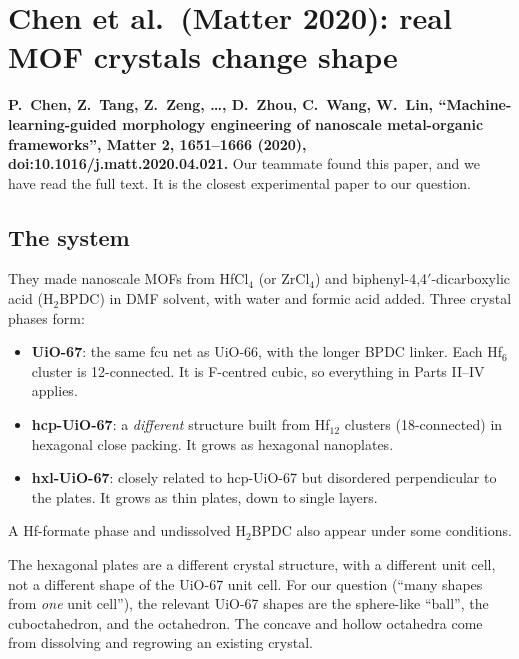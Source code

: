 \documentclass[11pt,a4paper]{article}
\theoremstyle{remark}\newtheorem*{example}{Worked example}
\begin{document}
\section{Chen et al.\ (Matter 2020): real MOF crystals change shape}\label{sec:chen}

\textbf{P.~Chen, Z.~Tang, Z.~Zeng, \dots, D.~Zhou, C.~Wang, W.~Lin, ``Machine-learning-guided morphology engineering of nanoscale metal-organic frameworks'', Matter 2, 1651--1666 (2020), doi:10.1016/j.matt.2020.04.021.} Our teammate found this paper, and we have read the full text. It is the closest experimental paper to our question.

\subsection{The system}
They made nanoscale MOFs from HfCl$_4$ (or ZrCl$_4$) and biphenyl-4,4$'$-dicarboxylic acid (H$_2$BPDC) in DMF solvent, with water and formic acid added. Three crystal phases form:
\begin{itemize}
\item \textbf{UiO-67}: the same fcu net as UiO-66, with the longer BPDC linker. Each Hf$_6$ cluster is 12-connected. It is F-centred cubic, so everything in Parts II--IV applies.
\item \textbf{hcp-UiO-67}: a \emph{different} structure built from Hf$_{12}$ clusters (18-connected) in hexagonal close packing. It grows as hexagonal nanoplates.
\item \textbf{hxl-UiO-67}: closely related to hcp-UiO-67 but disordered perpendicular to the plates. It grows as thin plates, down to single layers.
\end{itemize}
A Hf-formate phase and undissolved H$_2$BPDC also appear under some conditions.

\begin{careful}
The hexagonal plates are a different crystal structure, with a different unit cell, not a different shape of the UiO-67 unit cell. For our question (``many shapes from \emph{one} unit cell''), the relevant UiO-67 shapes are the sphere-like ``ball'', the cuboctahedron, and the octahedron. The concave and hollow octahedra come from dissolving and regrowing an existing crystal.
\end{careful}
\end{document}
